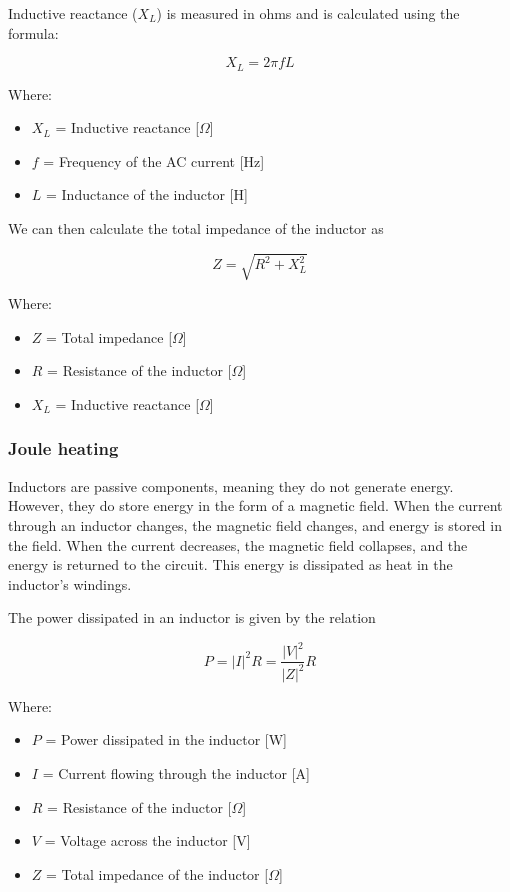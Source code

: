 Inductive reactance (\(X_L\)) is measured in ohms and is calculated using the formula:

\begin{equation}
    X_L = 2\pi fL
\end{equation}

Where:
\begin{itemize}
    \item \( X_L \) = Inductive reactance [\(\Omega\)]
    \item \( f \) = Frequency of the AC current [Hz]
    \item \( L \) = Inductance of the inductor [H]
\end{itemize}

We can then calculate the total impedance of the inductor as

\begin{equation}
    Z = \sqrt{R^2 + X_L^2}
\end{equation}

Where:
\begin{itemize}
    \item \( Z \) = Total impedance [\(\Omega\)]
    \item \( R \) = Resistance of the inductor [\(\Omega\)]
    \item \( X_L \) = Inductive reactance [\(\Omega\)]
\end{itemize}

\subsubsection{Joule heating}
Inductors are passive components, meaning they do not generate energy. However, they do store energy in the form of a magnetic field. When the current through an inductor changes, the magnetic field changes, and energy is stored in the field. When the current decreases, the magnetic field collapses, and the energy is returned to the circuit. This energy is dissipated as heat in the inductor's windings.

The power dissipated in an inductor is given by the relation

\begin{equation}
    P = |I|^2R = \frac{|V|^2}{|Z|^2}R
    \label{eq: Joule_heating}
\end{equation}

Where:
\begin{itemize}
    \item \( P \) = Power dissipated in the inductor [W]
    \item \( I \) = Current flowing through the inductor [A]
    \item \( R \) = Resistance of the inductor [\(\Omega\)]
    \item \( V \) = Voltage across the inductor [V]
    \item \( Z \) = Total impedance of the inductor [\(\Omega\)]
\end{itemize}


